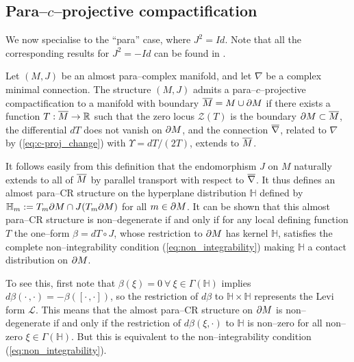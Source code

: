 \subsection{Para--$c$--projective compactification}

We now specialise to the ``para'' case, where $J^2=Id$. Note that all the corresponding results for $J^2=-Id$ can be found in \cite{CG}.

\begin{defi}
\label{defi_1}  Let $(M,J)$ be an almost para--complex manifold, and let $\nabla$ be a complex minimal connection. The structure $(M,J)$ admits a para--$c$--projective compactification to a manifold with boundary $\overline{M}=M\cup\partial M$
if there exists a function $T:\overline{M}\rightarrow \mathbb{R}$ such that the zero locus $\mathcal{Z}(T)$ is the boundary
$\partial M\subset \overline{M}$, the differential $dT$ does not vanish on $\partial M$, and the connection $\overline{\nabla}$, related to $\nabla$ by (\ref{eq:c-proj_change}) with $\Upsilon = dT/(2T)$, extends to $\overline{M}$.
\end{defi}



It follows easily from this definition that the endomorphism $J$ on $M$ naturally extends to all of $\overline{M}$ by parallel transport with respect to $\overline{\nabla}$. It thus defines an almost para--CR structure on the hyperplane distribution $ \mathbb{H} $ defined by $ \mathbb{H} _m:=T_m\partial M \cap J(T_m \partial M)$ for all $m\in\partial M$. It can be shown that this almost para--CR structure is non--degenerate if and only if for any local defining function $T$ the one--form $\beta=dT\circ J$, whose restriction to $\partial M$ has kernel $ \mathbb{H} $, satisfies the complete non--integrability condition (\ref{eq:non_integrability}) making $ \mathbb{H} $ a contact distribution on $\partial M$.

To see this, first note that $\beta(\xi)=0\ \forall\ \xi\in\Gamma( \mathbb{H} )$ implies $d\beta(\cdot\,,\cdot)=-\beta([\cdot\,,\cdot])$, so the restriction of $d\beta$ to $ \mathbb{H} \times \mathbb{H} $ represents the Levi form $\mathcal{L}$. This means that the almost para--CR structure on $\partial M$ is non--degenerate if and only if the restriction of $d\beta(\xi,\cdot)$ to $ \mathbb{H} $ is non--zero for all non--zero $\xi\in\Gamma( \mathbb{H} )$. But this is equivalent to the non--integrability condition (\ref{eq:non_integrability}).


